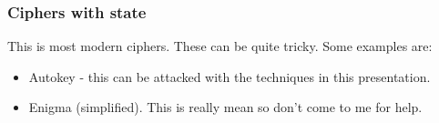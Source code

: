 \documentclass{beamer}
\begin{document}
\begin{frame}
\frametitle{Ciphers with state}

This is most modern ciphers. These can be quite tricky. Some examples are:

\begin{itemize}
\item Autokey - this can be attacked with the techniques in this presentation.
\item Enigma (simplified). This is really mean so don't come to me for help.
\end{itemize}
\end{frame}
\end{document}
